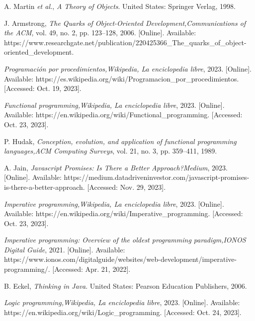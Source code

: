 \begin{thebibliography}{11}
    \label{sec:48}
    \hypertarget{48}{}
    A. Martin \textit{et al.}, \textit{A Theory of Objects}. United States: Springer Verlag, 1998.

    \label{sec:49}
    \hypertarget{49}{}
    J. Armstrong, \textit{The Quarks of Object-Oriented Development,}\textit{Communications of the ACM}, vol. 49, no. 2, pp. 123–128, 2006. [Online]. Available: https://www.researchgate.net/publication/220425366\_The\_quarks\_of\_object-oriented\_development.

    \label{sec:50}
    \hypertarget{50}{}
    \textit{Programación por procedimientos,}\textit{Wikipedia, La enciclopedia libre}, 2023. [Online]. Available: https://es.wikipedia.org/wiki/Programacion\_por\_procedimientos. [Accessed: Oct. 19, 2023].

    \label{sec:51}
    \hypertarget{51}{}
    \textit{Functional programming,}\textit{Wikipedia, La enciclopedia libre}, 2023. [Online]. Available: https://en.wikipedia.org/wiki/Functional\_programming. [Accessed: Oct. 23, 2023].
    
    \label{sec:52}
    \hypertarget{52}{}
    P. Hudak, \textit{Conception, evolution, and application of functional programming languages,}\textit{ACM Computing Surveys}, vol. 21, no. 3, pp. 359–411, 1989.

    \label{sec:53}
    \hypertarget{53}{}
    A. Jain, \textit{Javascript Promises: Is There a Better Approach?}\textit{Medium}, 2023. [Online]. Available: https://medium.datadriveninvestor.com/javascript-promises-is-there-a-better-approach. [Accessed: Nov. 29, 2023].

    \label{sec:54}
    \hypertarget{54}{}
    \textit{Imperative programming,}\textit{Wikipedia, La enciclopedia libre}, 2023. [Online]. Available: https://en.wikipedia.org/wiki/Imperative\_programming. [Accessed: Oct. 23, 2023].

    \label{sec:55}
    \hypertarget{55}{}
    \textit{Imperative programming: Overview of the oldest programming paradigm,}\textit{IONOS Digital Guide}, 2021. [Online]. Available: https://www.ionos.com/digitalguide/websites/web-development/imperative-programming/. [Accessed: Apr. 21, 2022].

    \label{sec:56}
    \hypertarget{56}{}
    B. Eckel, \textit{Thinking in Java}. United States: Pearson Education Publishers, 2006.

    \label{sec:57}
    \hypertarget{57}{}
    \textit{Logic programming,}\textit{Wikipedia, La enciclopedia libre}, 2023. [Online]. Available: https://en.wikipedia.org/wiki/Logic\_programming. [Accessed: Oct. 24, 2023].


\end{thebibliography}
